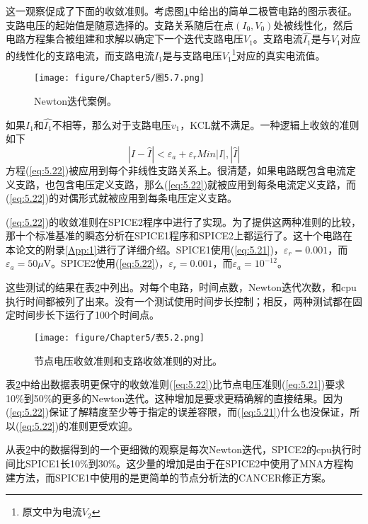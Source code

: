 这一观察促成了下面的收敛准则。考虑图\ref{图5.7}中给出的简单二极管电路的图示表征。支路电压的起始值是随意选择的。支路关系随后在点$(I_0,V_0)$处被线性化，然后电路方程集合被组建和求解以确定下一个迭代支路电压$V_1$。支路电流$\hat{I_1}$是与$V_1$对应的线性化的支路电流，而支路电流$I_1$是与支路电压$V_1$\footnote{原文中为电流$V_2$}对应的真实电流值。
\begin{figure}[htbp]
\small
    \centering
    \texttt{[image: figure/Chapter5/图5.7.png]}
    \caption{Newton迭代案例。}
    \label{图5.7}
\end{figure}

如果$I_1$和$\hat{I_1}$不相等，那么对于支路电压$v_1$，KCL就不满足。一种逻辑上收敛的准则如下
\begin{equation}
    |I-\hat{I}| < \varepsilon_a + \varepsilon_r Min{|I|,|\hat{I}|}
    \label{eq:5.22}
\end{equation}
方程(\ref{eq:5.22})被应用到每个非线性支路关系上。很清楚，如果电路既包含电流定义支路，也包含电压定义支路，那么(\ref{eq:5.22})就被应用到每条电流定义支路，而(\ref{eq:5.22})的对偶形式就被应用到每条电压定义支路。

(\ref{eq:5.22})的收敛准则在SPICE2程序中进行了实现。为了提供这两种准则的比较，那十个标准基准的瞬态分析在SPICE1程序和SPICE2上都运行了。这十个电路在本论文的附录\ref{App:1}进行了详细介绍。SPICE1使用(\ref{eq:5.21})，$\varepsilon_r = 0.001$，而$\varepsilon_a = 50\mu$V。SPICE2使用(\ref{eq:5.22})，$\varepsilon_r = 0.001$，而$\varepsilon_a = 10^{-12}$。

这些测试的结果在表\ref{表5.2}中列出。对每个电路，时间点数，Newton迭代次数，和cpu执行时间都被列了出来。没有一个测试使用时间步长控制；相反，两种测试都在固定时间步长下运行了100个时间点。
\begin{figure}[htbp]
\small
    \centering
    \texttt{[image: figure/Chapter5/表5.2.png]}
    \caption{节点电压收敛准则和支路收敛准则的对比。}
    \label{表5.2}
\end{figure}

表\ref{表5.2}中给出数据表明更保守的收敛准则(\ref{eq:5.22})比节点电压准则(\ref{eq:5.21})要求10\%到50\%的更多的Newton迭代。这种增加是要求更精确解的直接结果。因为(\ref{eq:5.22})保证了解精度至少等于指定的误差容限，而(\ref{eq:5.21})什么也没保证，所以(\ref{eq:5.22})的准则更受欢迎。

从表\ref{表5.2}中的数据得到的一个更细微的观察是每次Newton迭代，SPICE2的cpu执行时间比SPICE1长10\%到30\%。这少量的增加是由于在SPICE2中使用了MNA方程构建方法，而SPICE1中使用的是更简单的节点分析法的CANCER修正方案。

